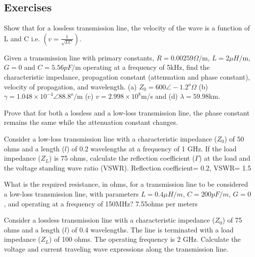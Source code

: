 \begin{mdframed}[backgroundcolor=lightblue, linewidth=1pt, hidealllines=true]
\section*{Exercises}
\begin{ExerciseList}
\Exercise[label={ex41}]
Show that for a lossless transmission line, the velocity of the wave is a function of L and C i.e. $\left(v = \frac{1}{\sqrt{LC}}\right)$.

\Exercise[label={ex42}]
Given a transmission line with primary constants, $R = 0.00259\varOmega/$m, $L = 2\mu H/$m, $G = 0$ and $C = 5.56pF/$m operating at a frequency of 5kHz, find the characteristic impedance, propagation constant (attenuation and phase constant), velocity of propagation, and wavelength.
\Answer[ref={ex42}]
(a) $Z_0 = 600\angle-1.2^o\varOmega$ (b) $\gamma = 1.048\times10^{-4}\angle88.8^o/$m (c) $v = 2.998\times10^8$m/s and (d) $\lambda = 59.98$km.

\Exercise[label={ex43}]
Prove that for both a lossless and a low-loss transmission line, the phase constant remains the same while the attenuation constant changes.

\Exercise[label={ex44}]
Consider a low-loss transmission line with a characteristic impedance ($Z_0$) of 50 ohms and a length ($l$) of 0.2 wavelengths at a frequency of 1 GHz. If the load impedance ($Z_L$) is 75 ohms, calculate the reflection coefficient ($\Gamma$) at the load and the voltage standing wave ratio (VSWR).
\Answer[ref={ex44}]
Reflection coefficient=  0.2, VSWR= 1.5

\Exercise[label={ex45}]
What is the required resistance, in ohms, for a transmission line to be considered a low-loss transmission line, with parameters $L=0.4\mu H/m$, $C=200pF/m$, $G=0$, and operating at a frequency of 150MHz?
\Answer[ref={ex45}]
7.55ohms per meters

\Exercise[label={ex46}]
Consider a lossless transmission line with a characteristic impedance ($Z_0$) of 75 ohms and a length ($l$) of 0.4 wavelengths. The line is terminated with a load impedance ($Z_L$) of 100 ohms. The operating frequency is 2 GHz.
Calculate the voltage and current traveling wave expressions along the transmission line.


\end{ExerciseList}
\end{mdframed}
